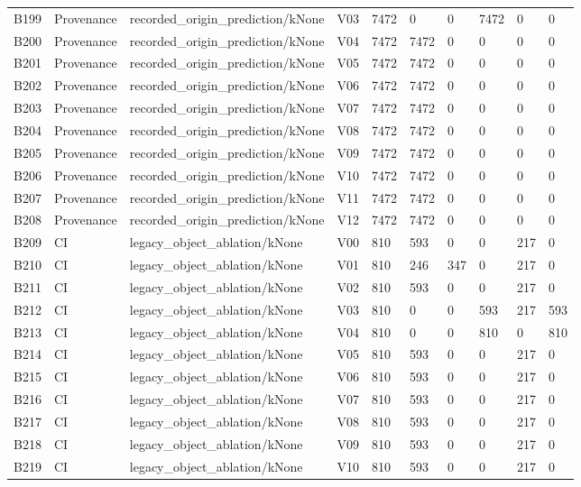 \begin{longtable}{llllllllll}
B199 & Provenance & recorded\_origin\_prediction/kNone & V03 & 7472 & 0 & 0 & 7472 & 0 & 0 \\
B200 & Provenance & recorded\_origin\_prediction/kNone & V04 & 7472 & 7472 & 0 & 0 & 0 & 0 \\
B201 & Provenance & recorded\_origin\_prediction/kNone & V05 & 7472 & 7472 & 0 & 0 & 0 & 0 \\
B202 & Provenance & recorded\_origin\_prediction/kNone & V06 & 7472 & 7472 & 0 & 0 & 0 & 0 \\
B203 & Provenance & recorded\_origin\_prediction/kNone & V07 & 7472 & 7472 & 0 & 0 & 0 & 0 \\
B204 & Provenance & recorded\_origin\_prediction/kNone & V08 & 7472 & 7472 & 0 & 0 & 0 & 0 \\
B205 & Provenance & recorded\_origin\_prediction/kNone & V09 & 7472 & 7472 & 0 & 0 & 0 & 0 \\
B206 & Provenance & recorded\_origin\_prediction/kNone & V10 & 7472 & 7472 & 0 & 0 & 0 & 0 \\
B207 & Provenance & recorded\_origin\_prediction/kNone & V11 & 7472 & 7472 & 0 & 0 & 0 & 0 \\
B208 & Provenance & recorded\_origin\_prediction/kNone & V12 & 7472 & 7472 & 0 & 0 & 0 & 0 \\
B209 & CI & legacy\_object\_ablation/kNone & V00 & 810 & 593 & 0 & 0 & 217 & 0 \\
B210 & CI & legacy\_object\_ablation/kNone & V01 & 810 & 246 & 347 & 0 & 217 & 0 \\
B211 & CI & legacy\_object\_ablation/kNone & V02 & 810 & 593 & 0 & 0 & 217 & 0 \\
B212 & CI & legacy\_object\_ablation/kNone & V03 & 810 & 0 & 0 & 593 & 217 & 593 \\
B213 & CI & legacy\_object\_ablation/kNone & V04 & 810 & 0 & 0 & 810 & 0 & 810 \\
B214 & CI & legacy\_object\_ablation/kNone & V05 & 810 & 593 & 0 & 0 & 217 & 0 \\
B215 & CI & legacy\_object\_ablation/kNone & V06 & 810 & 593 & 0 & 0 & 217 & 0 \\
B216 & CI & legacy\_object\_ablation/kNone & V07 & 810 & 593 & 0 & 0 & 217 & 0 \\
B217 & CI & legacy\_object\_ablation/kNone & V08 & 810 & 593 & 0 & 0 & 217 & 0 \\
B218 & CI & legacy\_object\_ablation/kNone & V09 & 810 & 593 & 0 & 0 & 217 & 0 \\
B219 & CI & legacy\_object\_ablation/kNone & V10 & 810 & 593 & 0 & 0 & 217 & 0 \\

\end{longtable}
